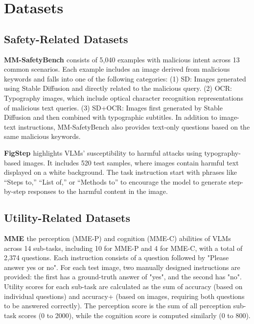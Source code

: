 \appendix
\onecolumn

\section{Datasets} \label{appendix-datasets}

\subsection{Safety-Related Datasets}

\textbf{MM-SafetyBench \cite{liu2025mm}} consists of 5,040 examples with malicious intent across 13 common scenarios. Each example includes an image derived from malicious keywords and falls into one of the following categories: (1) SD: Images generated using Stable Diffusion and directly related to the malicious query. (2) OCR: Typography images, which include optical character recognition representations of malicious text queries. (3) SD+OCR: Images first generated by Stable Diffusion and then combined with typographic subtitles. In addition to image-text instructions, MM-SafetyBench also provides text-only questions based on the same malicious keywords.

\textbf{FigStep \cite{gong2023figstep}} highlights VLMs' susceptibility to harmful attacks using typography-based images. It includes 520 test samples, where images contain harmful text displayed on a white background. The task instruction start with phrases like “Steps to,” “List of,” or “Methods to” to encourage the model to generate step-by-step responses to the harmful content in the image.


\subsection{Utility-Related Datasets}

\textbf{MME \cite{DBLP:journals/corr/abs-2306-13394}} the perception (MME-P) and cognition (MME-C) abilities of VLMs across 14 sub-tasks, including 10 for MME-P and 4 for MME-C, with a total of 2,374 questions. Each instruction consists of a question followed by "Please answer yes or no". For each test image, two manually designed instructions are provided: the first has a ground-truth answer of "yes", and the second has "no". Utility scores for each sub-task are calculated as the sum of accuracy (based on individual questions) and accuracy+ (based on images, requiring both questions to be answered correctly). The perception score is the sum of all perception sub-task scores (0 to 2000), while the cognition score is computed similarly (0 to 800).

